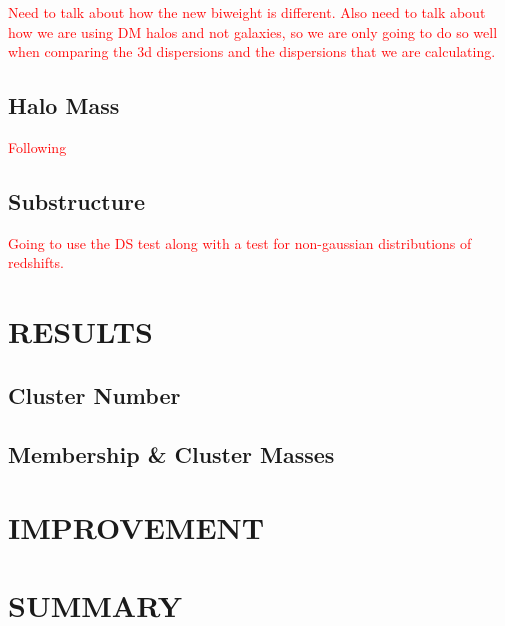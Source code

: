 \documentclass[apj, twocolappendix]{emulateapj}
\newcommand{\editorial}[1]{\textcolor{red}{#1} }
\begin{document}
\editorial{Need to talk about how the new biweight is different. Also need to talk about how we are using DM halos and not galaxies, so we are only going to do so well when comparing the 3d dispersions and the dispersions that we are calculating.}





\subsection{Halo Mass}

\editorial{Following \cite{Evrard2008, VanderBurg2014, Sifon2013}}

\subsection{Substructure}

\editorial{Going to use the DS test along with a test for non-gaussian distributions of redshifts.}

\section{RESULTS}
\subsection{Cluster Number}
\subsection{Membership \& Cluster Masses}

\section{IMPROVEMENT}
\section{SUMMARY}


\end{document}
